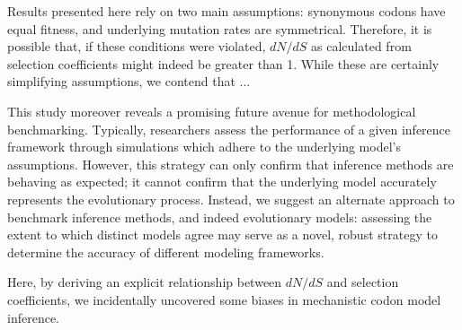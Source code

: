 \documentclass[11pt]{article}
\begin{document}



Results presented here rely on two main assumptions: synonymous codons have equal fitness, and underlying mutation rates are symmetrical. Therefore, it is possible that, if these conditions were violated, $dN/dS$ as calculated from selection coefficients might indeed be greater than 1. While these are certainly simplifying assumptions, we contend that  ...


This study moreover reveals a promising future avenue for methodological benchmarking. Typically, researchers assess the performance of a given inference framework through simulations which adhere to the underlying model's assumptions. However, this strategy can only confirm that inference methods are behaving as expected; it cannot confirm that the underlying model accurately represents the evolutionary process. Instead, we suggest an alternate approach to benchmark inference methods, and indeed evolutionary models: assessing the extent to which distinct models agree may serve as a novel, robust strategy to determine the accuracy of different modeling frameworks.



 Here, by deriving an explicit relationship between $dN/dS$ and selection coefficients, we incidentally uncovered some biases in mechanistic codon model inference. 
\end{document}
